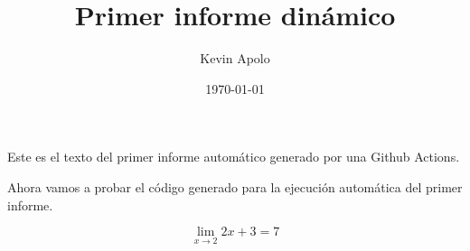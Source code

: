 \documentclass[12pt, a4paper]{book}
\title{Primer informe dinámico}
\author{Kevin Apolo}
\date{\today}
\begin{document}
\maketitle

Este es el texto del primer informe automático generado por una Github Actions.\newline

Ahora vamos a probar el código generado para la ejecución automática del primer informe.\newline

$$\lim_{x \rightarrow 2} 2x+3 = 7$$
\end{document}
